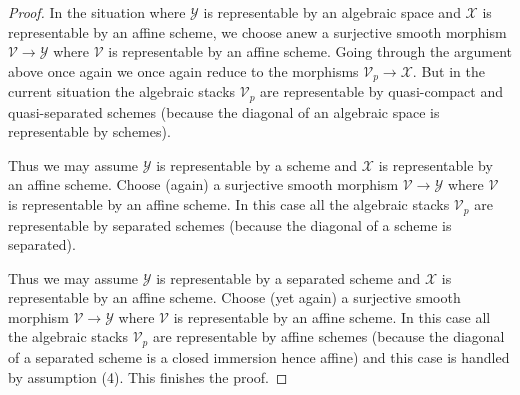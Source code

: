 \documentclass[10pt,a4paper]{amsart}
\theoremstyle{plain}
\theoremstyle{definition}
\theoremstyle{remark}
\numberwithin{equation}{subsection}
\begin{document}
\begin{proof}
\medskip\noindent
In the situation where $\mathcal{Y}$ is representable by an algebraic
space and $\mathcal{X}$ is representable by an affine scheme, we choose
anew a surjective smooth morphism $\mathcal{V} \to \mathcal{Y}$ where
$\mathcal{V}$ is representable by an affine scheme. Going through the
argument above once again we once again reduce to the morphisms
$\mathcal{V}_p \to \mathcal{X}$. But in the current situation the algebraic
stacks $\mathcal{V}_p$ are representable by quasi-compact and quasi-separated
schemes (because the diagonal of an algebraic space is representable by
schemes).

\medskip\noindent
Thus we may assume $\mathcal{Y}$ is representable by a scheme and
$\mathcal{X}$ is representable by an affine scheme. Choose (again)
a surjective smooth morphism $\mathcal{V} \to \mathcal{Y}$ where
$\mathcal{V}$ is representable by an affine scheme. In this case all
the algebraic stacks $\mathcal{V}_p$ are representable by separated
schemes (because the diagonal of a scheme is separated).

\medskip\noindent
Thus we may assume $\mathcal{Y}$ is representable by a separated scheme and
$\mathcal{X}$ is representable by an affine scheme. Choose (yet again)
a surjective smooth morphism $\mathcal{V} \to \mathcal{Y}$ where
$\mathcal{V}$ is representable by an affine scheme. In this case all
the algebraic stacks $\mathcal{V}_p$ are representable by affine schemes
(because the diagonal of a separated scheme is a closed immersion hence affine)
and this case is handled by assumption (4).
This finishes the proof.
\end{proof}
\end{document}
